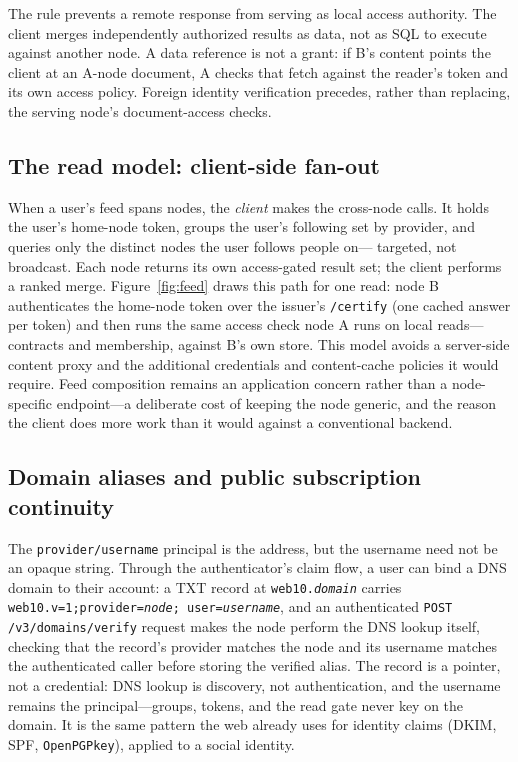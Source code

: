 \documentclass[sigconf, nonacm]{acmart}
\begin{document}
The rule prevents a remote response from serving as local access authority.
The client merges independently authorized results as data, not as SQL to
execute against another node. A data reference is not a grant: if B's content
points the client at an A-node document, A checks that fetch against the
reader's token and its own access policy. Foreign identity verification
precedes, rather than replacing, the serving node's document-access checks.

\subsection{The read model: client-side fan-out}

When a user's feed spans nodes, the \emph{client} makes the cross-node calls.
It holds the user's home-node token, groups the user's following set by
provider, and queries only the distinct nodes the user follows people on---
targeted, not broadcast. Each node returns its own access-gated result set;
the client performs a ranked merge. Figure~\ref{fig:feed} draws this path for
one read: node B authenticates the home-node token over the issuer's
\texttt{/certify} (one cached answer per token) and then runs the same access
check node A runs on local reads---contracts and membership, against B's own
store. This model avoids a server-side content
proxy and the additional credentials and content-cache policies it would
require. Feed composition remains an application concern rather than a
node-specific endpoint---a deliberate cost of keeping the node generic, and
the reason the client does more work than it would against a conventional
backend.

\subsection{Domain aliases and public subscription continuity}

The \texttt{provider/username} principal is the address, but the username
need not be an opaque string. Through the authenticator's claim flow, a user
can bind a DNS domain to their account: a TXT record at
\texttt{web10.\emph{domain}} carries
\texttt{web10.v=1;\allowbreak provider=\emph{node};\allowbreak
user=\emph{username}}, and an authenticated \texttt{POST
/v3/domains/verify} request makes the node perform the DNS lookup itself,
checking that the record's provider matches the node and its username
matches the authenticated caller before storing the verified alias. The
record is a pointer, not a credential: DNS lookup is discovery, not
authentication, and the username remains the principal---groups, tokens, and
the read gate never key on the domain. It is the same pattern the web already
uses for identity claims (DKIM, SPF, \texttt{OpenPGPkey}), applied to a
social identity.
\end{document}
